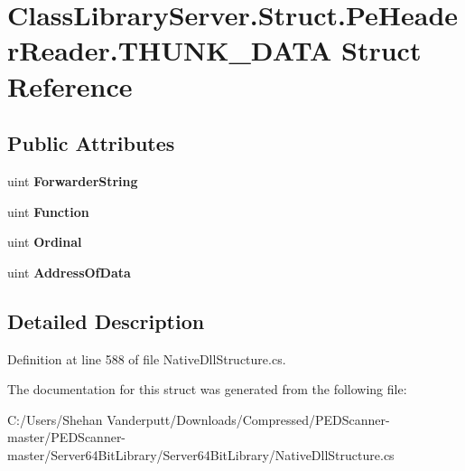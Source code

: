 \hypertarget{struct_class_library_server_1_1_struct_1_1_pe_header_reader_1_1_t_h_u_n_k___d_a_t_a}{}\section{Class\+Library\+Server.\+Struct.\+Pe\+Header\+Reader.\+T\+H\+U\+N\+K\+\_\+\+D\+A\+TA Struct Reference}
\label{struct_class_library_server_1_1_struct_1_1_pe_header_reader_1_1_t_h_u_n_k___d_a_t_a}
\subsection*{Public Attributes}
\begin{DoxyCompactItemize}
\item 
\mbox{\label{struct_class_library_server_1_1_struct_1_1_pe_header_reader_1_1_t_h_u_n_k___d_a_t_a_a31cf105d9ec05b865294560fdb1382d5}} 
uint {\bfseries Forwarder\+String}
\item 
\mbox{\label{struct_class_library_server_1_1_struct_1_1_pe_header_reader_1_1_t_h_u_n_k___d_a_t_a_abfe09078952795a5fc8c26d0cf8b8ade}} 
uint {\bfseries Function}
\item 
\mbox{\label{struct_class_library_server_1_1_struct_1_1_pe_header_reader_1_1_t_h_u_n_k___d_a_t_a_ac512dc011b05d21057659aea835b7028}} 
uint {\bfseries Ordinal}
\item 
\mbox{\label{struct_class_library_server_1_1_struct_1_1_pe_header_reader_1_1_t_h_u_n_k___d_a_t_a_a06558fc4f7b01d40b801fe585afe7ada}} 
uint {\bfseries Address\+Of\+Data}
\end{DoxyCompactItemize}


\subsection{Detailed Description}


Definition at line 588 of file Native\+Dll\+Structure.\+cs.



The documentation for this struct was generated from the following file\+:\begin{DoxyCompactItemize}
\item 
C\+:/\+Users/\+Shehan Vanderputt/\+Downloads/\+Compressed/\+P\+E\+D\+Scanner-\/master/\+P\+E\+D\+Scanner-\/master/\+Server64\+Bit\+Library/\+Server64\+Bit\+Library/Native\+Dll\+Structure.\+cs\end{DoxyCompactItemize}

